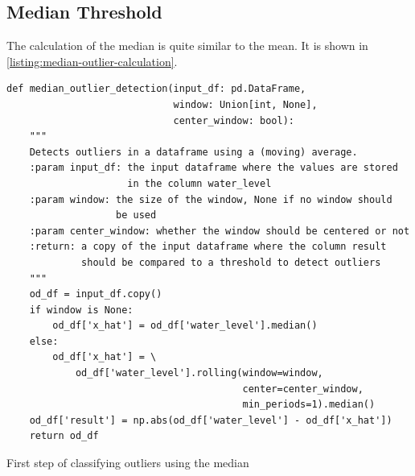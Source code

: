\subsection{Median Threshold}
The calculation of the median is quite similar to the mean. It is shown in \autoref{listing:median-outlier-calculation}.
\begin{listing}
\begin{verbatim}
def median_outlier_detection(input_df: pd.DataFrame,
                             window: Union[int, None],
                             center_window: bool):
    """
    Detects outliers in a dataframe using a (moving) average.
    :param input_df: the input dataframe where the values are stored
                     in the column water_level
    :param window: the size of the window, None if no window should
                   be used
    :param center_window: whether the window should be centered or not
    :return: a copy of the input dataframe where the column result
             should be compared to a threshold to detect outliers
    """
    od_df = input_df.copy()
    if window is None:
        od_df['x_hat'] = od_df['water_level'].median()
    else:
        od_df['x_hat'] = \
            od_df['water_level'].rolling(window=window,
                                         center=center_window,
                                         min_periods=1).median()
    od_df['result'] = np.abs(od_df['water_level'] - od_df['x_hat'])
    return od_df
\end{verbatim}
\caption{First step of classifying outliers using the median}
\label{listing:median-outlier-calculation}
\end{listing}

